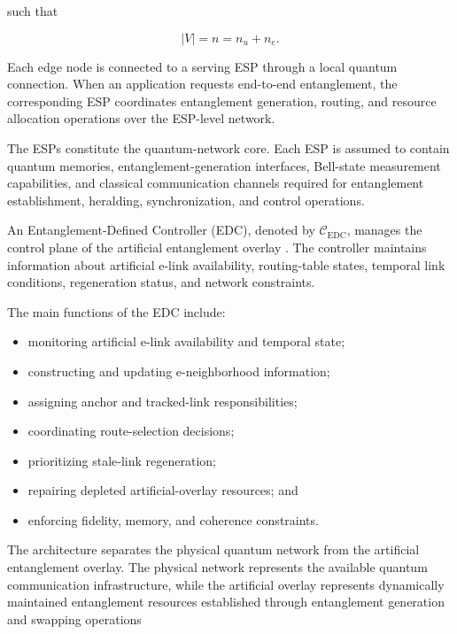 such that

\begin{equation}
    |V|
    =
    n
    =
    n_u+n_e.
\end{equation}

Each edge node is connected to a serving ESP through a local quantum connection. When an application requests end-to-end entanglement, the corresponding ESP coordinates entanglement generation, routing, and resource allocation operations over the ESP-level network.

The ESPs constitute the quantum-network core. Each ESP is assumed to contain quantum memories, entanglement-generation interfaces, Bell-state measurement capabilities, and classical communication channels required for entanglement establishment, heralding, synchronization, and control operations.

An Entanglement-Defined Controller (EDC), denoted by $\mathcal{C}_{\mathrm{EDC}}$, manages the control plane of the artificial entanglement overlay \cite{caleffi2025quantumarchitecture,dahlberg2019networks} . The controller maintains information about artificial e-link availability, routing-table states, temporal link conditions, regeneration status, and network constraints.

The main functions of the EDC include:

\begin{itemize}
    \item monitoring artificial e-link availability and temporal state;
    \item constructing and updating e-neighborhood information;
    \item assigning anchor and tracked-link responsibilities;
    \item coordinating route-selection decisions;
    \item prioritizing stale-link regeneration;
    \item repairing depleted artificial-overlay resources; and
    \item enforcing fidelity, memory, and coherence constraints.
\end{itemize}

The architecture separates the physical quantum network from the artificial entanglement overlay. The physical network represents the available quantum communication infrastructure, while the artificial overlay represents dynamically maintained entanglement resources established through entanglement generation and swapping operations \cite{caleffi2025quantumarchitecture,lee2022router}

